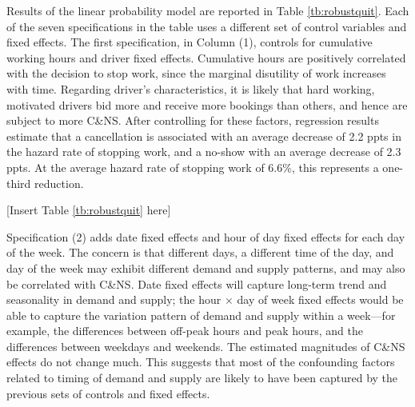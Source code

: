 \documentclass[reviewmode]{restat}
\begin{document}
Results of the linear probability model are reported in Table \ref{tb:robustquit}. Each of the seven 
specifications in the table uses a different set of control variables and fixed effects. 
The first specification, in Column (1), controls for cumulative working hours and driver fixed effects.
Cumulative hours are positively correlated with the decision to stop work, since the marginal disutility 
of work increases with time. Regarding driver's characteristics, it is likely that hard working, motivated
drivers bid more and receive more bookings than others, and hence are subject to more C\&NS. After 
controlling for these factors, regression results estimate that a cancellation is associated with an
average decrease of 2.2 ppts in the hazard rate of stopping work, and a no-show with an average decrease
of 2.3 ppts. At the average hazard rate of stopping work of 6.6\%, this represents a one-third reduction.

\begin{center}
	[Insert Table \ref{tb:robustquit} here]
\end{center}

Specification (2) adds date fixed effects and hour of day fixed effects for each day of the week. 
The concern is that different days, a different time of the day, and day of the week may exhibit different
demand and supply patterns, and may also be correlated with C\&NS. Date fixed effects will capture long-term
trend and seasonality in demand and supply; the hour $\times$ day of week fixed effects would be able to capture
the variation pattern of demand and supply within a week---for example, the differences between off-peak hours
and peak hours, and the differences between weekdays and weekends. The estimated magnitudes of C\&NS effects 
do not change much. This suggests that most of the confounding factors related to timing of demand and supply
are likely to have been captured by the previous sets of controls and fixed effects. 
\end{document}
